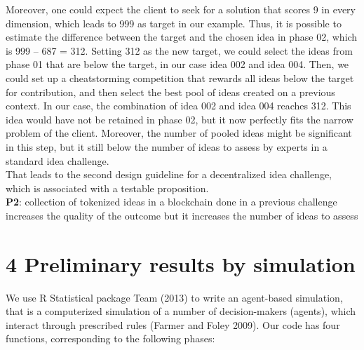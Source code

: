 \documentclass[]{elsarticle} %
\begin{document}
Moreover, one could expect the client to seek for a solution that scores
9 in every dimension, which leads to 999 as target in our example. Thus,
it is possible to estimate the difference between the target and the
chosen idea in phase 02, which is 999 -- 687 = 312. Setting 312 as the
new target, we could select the ideas from phase 01 that are below the
target, in our case idea 002 and idea 004. Then, we could set up a
cheatstorming competition that rewards all ideas below the target for
contribution, and then select the best pool of ideas created on a
previous context. In our case, the combination of idea 002 and idea 004
reaches 312. This idea would have not be retained in phase 02, but it
now perfectly fits the narrow problem of the client. Moreover, the
number of pooled ideas might be significant in this step, but it still
below the number of ideas to assess by experts in a standard idea
challenge.\\
That leads to the second design guideline for a decentralized idea
challenge, which is associated with a testable proposition.\\
\textbf{P2}: collection of tokenized ideas in a blockchain done in a
previous challenge increases the quality of the outcome but it increases
the number of ideas to assess

\section{4 Preliminary results by
simulation}\label{preliminary-results-by-simulation}

We use R Statistical package Team (2013) to write an agent-based
simulation, that is a computerized simulation of a number of
decision-makers (agents), which interact through prescribed rules
(Farmer and Foley 2009). Our code has four functions, corresponding to
the following phases:
\end{document}
